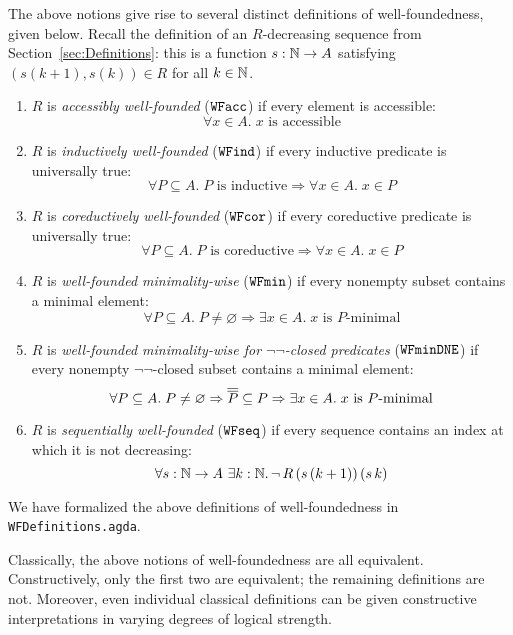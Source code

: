 The above notions give rise to several distinct definitions of well-foundedness, given below. 
Recall the definition of an $R$-decreasing sequence from Section~\ref{sec:Definitions}:
this is a function $s : \mathbb{N} \to A$ satisfying $(s(k+1),s(k)) \in R$ for all $k \in \mathbb{N}$.

\begin{definition} \label{def:WFproperties} \hfill 
  \begin{enumerate}
    \item $R$ is \emph{accessibly well-founded} ($\mathtt{WFacc}$) if every element is accessible:
      \[
        \forall x \in A.\; x \text{ is accessible}
      \]
    \item \label{def:WFind} $R$ is \emph{inductively well-founded} ($\mathtt{WFind}$) if every inductive predicate is universally true:
      \[
        \forall P \subseteq A.\;\text{$P$ is inductive} \Rightarrow \forall x \in A.\; x \in P
      \]
    \item $R$ is \emph{coreductively well-founded} ($\mathtt{WFcor}$) if every coreductive predicate is universally true:
      \[
        \forall P \subseteq A.\;\text{$P$ is coreductive} \Rightarrow \forall x \in A.\; x \in P
      \]
    \item  $R$ is \emph{well-founded minimality-wise} ($\mathtt{WFmin}$) if every nonempty subset contains a minimal element:
      \[
        \forall P \subseteq A.\; P \neq \varnothing \Rightarrow
        \exists x \in A.\; \text{$x$ is $P$-minimal}
      \]
    \item  $R$ is \emph{well-founded minimality-wise for $\lnot \lnot$-closed predicates} ($\mathtt{WFminDNE}$) if every nonempty $\lnot \lnot$-closed subset contains a minimal element:
      \[
        \forall P \subseteq A.\; P \neq \varnothing \Rightarrow \overline{\overline{P}} \subseteq P \Rightarrow
        \exists x \in A.\; \text{$x$ is $P$-minimal}
      \]
   \item $R$ is \emph{sequentially well-founded} ($\mathtt{WFseq}$) if every sequence contains an index at which it is not decreasing:
      \[
        \forall s : \mathbb{N} \to A\ \exists k : \mathbb{N}.\, \lnot \, R \,(s\,(k+1))\,(s\,k)
      \]
  \end{enumerate}
\end{definition}
We have formalized the above definitions of well-foundedness in \texttt{WFDefinitions.agda}. 

Classically, the above notions of well-foundedness are all equivalent.  Constructively, only the first two are equivalent; the remaining definitions are not. Moreover, even individual classical definitions can be given constructive
interpretations in varying degrees of logical strength.

